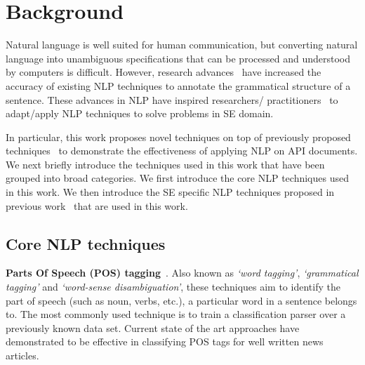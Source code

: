 \section{Background}
\label{sec:background}

Natural language is well suited for human communication, but converting natural language into unambiguous specifications that can be processed and understood by computers is difficult.
However, research advances~\cite{Marneffe06LREC,Marneffe08COLING,Klein03,KleinNIPS03} have increased the accuracy of existing NLP techniques to annotate the grammatical structure of a sentence.
These advances in NLP have inspired researchers/ practitioners~\cite{pandita12:inferring, pandita13:WHYPER, johnSlankasPASSAT13, XiaoFSE2012, thummalapentaICSE12} to adapt/apply NLP techniques to solve problems in SE domain.

In particular, this work proposes novel techniques on top of previously proposed techniques~\cite{pandita12:inferring, pandita13:WHYPER} to demonstrate the effectiveness of applying NLP on API documents.
We next briefly introduce the techniques used in this work that have been grouped into broad categories.
We first introduce the core NLP techniques used in this work.
We then introduce the SE specific NLP techniques proposed in previous work~\cite{pandita12:inferring,pandita13:WHYPER} that are used in this work.

\subsection{Core NLP techniques}
\label{sub:CoreNLPback}



\textbf{Parts Of Speech (POS) tagging}~\cite{Klein03,KleinNIPS03}. Also known as \textit{`word tagging'}, \textit{`grammatical tagging'} and \textit{`word-sense disambiguation'}, these techniques aim to identify the part of speech (such as noun, verbs, etc.), a particular word in a sentence belongs to. The most commonly used technique is to train a classification parser over a previously known data set. Current state of the art approaches have demonstrated to be effective in classifying POS tags for well written news articles.

